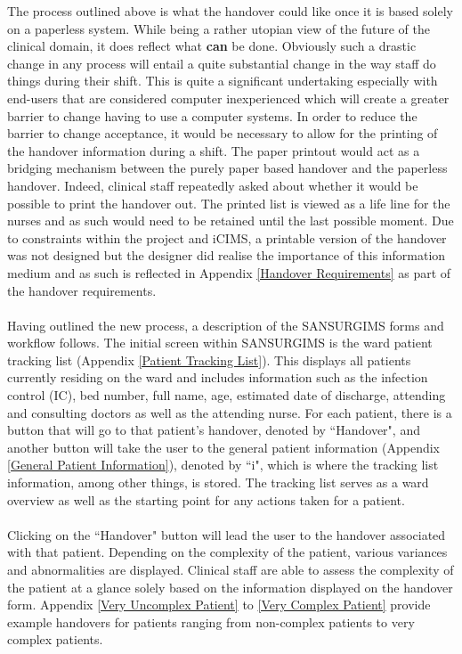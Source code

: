 \newpage
\noindent The process outlined above is what the handover could like once it is based solely on a paperless system. While being a rather utopian view of the future of the clinical domain, it does reflect what \textbf{can} be done. Obviously such a drastic change in any process will entail a quite substantial change in the way staff do things during their shift. This is quite a significant undertaking especially with end-users that are considered computer inexperienced which will create a greater barrier to change having to use a computer systems. In order to reduce the barrier to change acceptance, it would be necessary to allow for the printing of the handover information during a shift. The paper printout would act as a bridging mechanism between the purely paper based handover and the paperless handover. Indeed, clinical staff repeatedly asked about whether it would be possible to print the handover out. The printed list is viewed as a life line for the nurses and as such would need to be retained until the last possible moment. Due to constraints within the project and iCIMS, a printable version of the handover was not designed but the designer did realise the importance of this information medium and as such is reflected in Appendix \ref{Handover Requirements} as part of the handover requirements.
\\ \\
Having outlined the new process, a description of the SANSURGIMS forms and workflow follows. The initial screen within SANSURGIMS is the ward patient tracking list (Appendix \ref{Patient Tracking List}). This displays all patients currently residing on the ward and includes information such as the infection control (IC), bed number, full name, age, estimated date of discharge, attending and consulting doctors as well as the attending nurse. For each patient, there is a button that will go to that patient's handover, denoted by ``Handover", and another button will take the user to the general patient information (Appendix \ref{General Patient Information}), denoted by ``i", which is where the tracking list information, among other things, is stored. The tracking list serves as a ward overview as well as the starting point for any actions taken for a patient.
\\ \\
Clicking on the ``Handover" button will lead the user to the handover associated with that patient. Depending on the complexity of the patient, various variances and abnormalities are displayed. Clinical staff are able to assess the complexity of the patient at a glance solely based on the information displayed on the handover form. Appendix \ref{Very Uncomplex Patient} to \ref{Very Complex Patient} provide example handovers for patients ranging from non-complex patients to very complex patients. 


